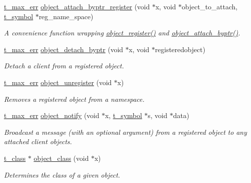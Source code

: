 \begin{DoxyCompactItemize}
\hyperlink{group__datatypes_ga73edaae82b318855cc09fac994918165}{t\_\-max\_\-err} \hyperlink{group__obj_ga73adb1c1e2db98f7a500f50ac447add5}{object\_\-attach\_\-byptr\_\-register} (void $\ast$x, void $\ast$object\_\-to\_\-attach, \hyperlink{structt__symbol}{t\_\-symbol} $\ast$reg\_\-name\_\-space)
\begin{DoxyCompactList}\small\item\em A convenience function wrapping \hyperlink{group__obj_gaaa97beba179d6aebd3f3ede1b5c781fa}{object\_\-register()} and \hyperlink{group__obj_ga76657298bcd43ae4f9098e3ed2b97c72}{object\_\-attach\_\-byptr()}. \item\end{DoxyCompactList}\item 
\hyperlink{group__datatypes_ga73edaae82b318855cc09fac994918165}{t\_\-max\_\-err} \hyperlink{group__obj_ga9be48cfb39024dc20239079eb60295cd}{object\_\-detach\_\-byptr} (void $\ast$x, void $\ast$registeredobject)
\begin{DoxyCompactList}\small\item\em Detach a client from a registered object. \item\end{DoxyCompactList}\item 
\hyperlink{group__datatypes_ga73edaae82b318855cc09fac994918165}{t\_\-max\_\-err} \hyperlink{group__obj_ga2b5b3327e03edbefe753ebd6c8b7e152}{object\_\-unregister} (void $\ast$x)
\begin{DoxyCompactList}\small\item\em Removes a registered object from a namespace. \item\end{DoxyCompactList}\item 
\hyperlink{group__datatypes_ga73edaae82b318855cc09fac994918165}{t\_\-max\_\-err} \hyperlink{group__obj_ga6297b81c3a70f7fb2201c7262e96bba3}{object\_\-notify} (void $\ast$x, \hyperlink{structt__symbol}{t\_\-symbol} $\ast$s, void $\ast$data)
\begin{DoxyCompactList}\small\item\em Broadcast a message (with an optional argument) from a registered object to any attached client objects. \item\end{DoxyCompactList}\item 
\hyperlink{structt__class}{t\_\-class} $\ast$ \hyperlink{group__obj_ga035c5ca1d7d25921533b59451d730c44}{object\_\-class} (void $\ast$x)
\begin{DoxyCompactList}\small\item\em Determines the class of a given object. \item\end{DoxyCompactList}\item 

\end{DoxyCompactItemize}
